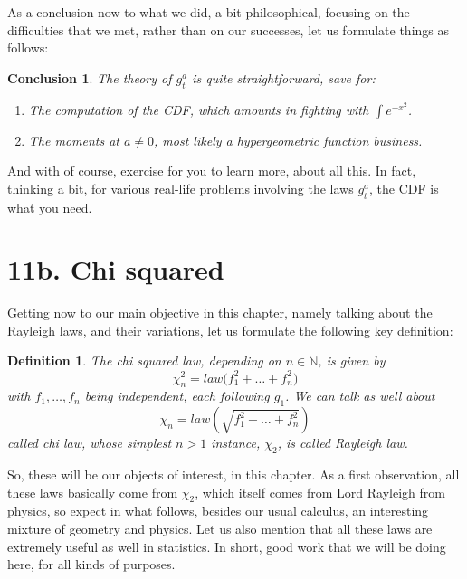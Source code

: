 \documentclass[12pt]{amsbook}
\newtheorem{conclusion}[theorem]{Conclusion}
\newtheorem{definition}[theorem]{Definition}
\begin{document}
\bigskip

As a conclusion now to what we did, a bit philosophical, focusing on the difficulties that we met, rather than on our successes, let us formulate things as follows:

\begin{conclusion}
The theory of $g_t^a$ is quite straightforward, save for:
\begin{enumerate}
\item The computation of the CDF, which amounts in fighting with $\int e^{-x^2}$.

\item The moments at $a\neq0$, most likely a hypergeometric function business.
\end{enumerate}
\end{conclusion}

And with of course, exercise for you to learn more, about all this. In fact, thinking a bit, for various real-life problems involving the laws $g_t^a$, the CDF is what you need.

\section*{11b. Chi squared}

Getting now to our main objective in this chapter, namely talking about the Rayleigh laws, and their variations, let us formulate the following key definition:


\begin{definition}
The chi squared law, depending on $n\in\mathbb N$, is given by
$$\chi_n^2=law\Big(f_1^2+\ldots+f_n^2\Big)$$
with $f_1,\ldots,f_n$ being independent, each following $g_1$. We can talk as well about
$$\chi_n=law\left(\sqrt{f_1^2+\ldots+f_n^2}\right)$$
called chi law, whose simplest $n>1$ instance, $\chi_2$, is called Rayleigh law.
\end{definition}

So, these will be our objects of interest, in this chapter. As a first observation, all these laws basically come from $\chi_2$, which itself comes from Lord Rayleigh from physics, so expect in what follows, besides our usual calculus, an interesting mixture of geometry and physics. Let us also mention that all these laws are extremely useful as well in statistics. In short, good work that we will be doing here, for all kinds of purposes.

\bigskip
\end{document}
